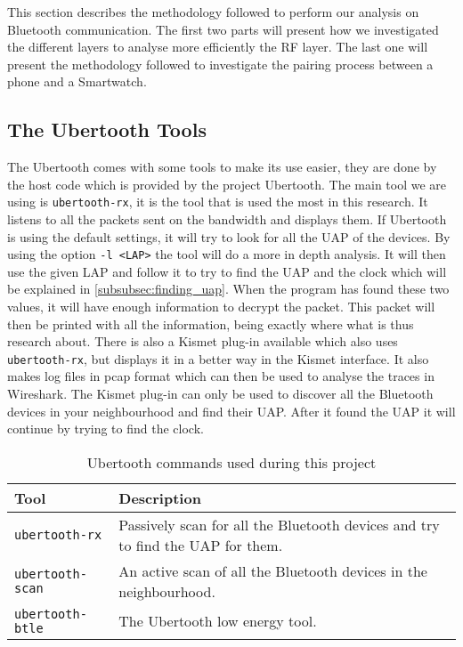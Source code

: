 This section describes the methodology followed to perform our analysis on Bluetooth communication. The first two parts will present how we investigated the different layers to analyse more efficiently the RF layer. The last one will present the methodology followed to investigate the pairing process between a phone and a Smartwatch.


\subsection{The Ubertooth Tools}
\label{subsubsec:ubertooth_tools}
The Ubertooth comes with some tools to make its use easier, they are done by the host code which is provided by the project Ubertooth. 
The main tool we are using is \verb|ubertooth-rx|, it is the tool that is used the most in this research. It listens to all the packets sent on the bandwidth and displays them. If Ubertooth is using the default settings, it will try to look for all the UAP of the devices. By using the option \verb|-l <LAP>| the tool will do a more in depth analysis. It will then use the given LAP and follow it to try to find the UAP and the clock which will be explained in \ref{subsubsec:finding_uap}. When the program has found these two values, it will have enough information to decrypt the packet. This packet will then be printed with all the information, being exactly where what is thus research about. \pend There is also a Kismet plug-in available which also uses \verb|ubertooth-rx|, but displays it in a better way in the Kismet interface. It also makes log files in pcap format which can then be used to analyse the traces in Wireshark. The Kismet plug-in can only be used to discover all the Bluetooth devices in your neighbourhood and find their UAP. After it found the UAP it will continue by trying to find the clock.

\begin{table}[!h]
\begin{tabular}{|l|l|}
\hline
Tool & Description \\
\hline
\verb|ubertooth-rx| & Passively scan for all the Bluetooth devices and try to find the UAP for them. \\
\hline
\verb|ubertooth-scan| & An active scan of all the Bluetooth devices in the neighbourhood.  \\
\hline
\verb|ubertooth-btle| & The Ubertooth low energy tool. \\
\hline
\end{tabular}
\caption{Ubertooth commands used during this project}
\label{tab:ubertooth_tools}
\end{table}
\newpage